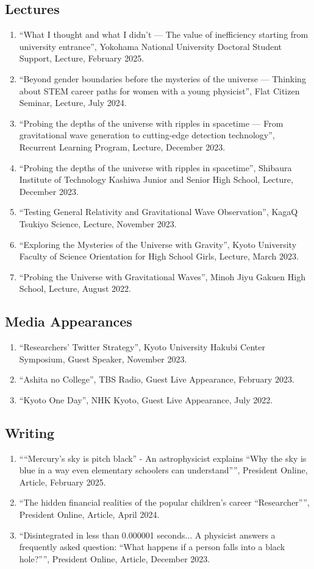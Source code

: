 \documentclass[uplatex, 12pt]{article}
\begin{document}
\subsection*{Lectures}
\begin{enumerate}
\item “What I thought and what I didn’t — The value of inefficiency starting from university entrance”, Yokohama National University Doctoral Student Support, Lecture, February 2025.
\item “Beyond gender boundaries before the mysteries of the universe — Thinking about STEM career paths for women with a young physicist”, Flat Citizen Seminar, Lecture, July 2024.
\item “Probing the depths of the universe with ripples in spacetime — From gravitational wave generation to cutting-edge detection technology”, Recurrent Learning Program, Lecture, December 2023.
\item “Probing the depths of the universe with ripples in spacetime”, Shibaura Institute of Technology Kashiwa Junior and Senior High School, Lecture, December 2023.
\item “Testing General Relativity and Gravitational Wave Observation”, KagaQ Tsukiyo Science, Lecture, November 2023.
\item “Exploring the Mysteries of the Universe with Gravity”, Kyoto University Faculty of Science Orientation for High School Girls, Lecture, March 2023.
\item “Probing the Universe with Gravitational Waves”, Minoh Jiyu Gakuen High School, Lecture, August 2022.
\end{enumerate}
\subsection*{Media Appearances}
\begin{enumerate}
\item “Researchers’ Twitter Strategy”, Kyoto University Hakubi Center Symposium, Guest Speaker, November 2023.
\item “Ashita no College”, TBS Radio, Guest Live Appearance, February 2023.
\item “Kyoto One Day”, NHK Kyoto, Guest Live Appearance, July 2022.
\end{enumerate}
\subsection*{Writing}
\begin{enumerate}
\item ““Mercury’s sky is pitch black” - An astrophysicist explains “Why the sky is blue in a way even elementary schoolers can understand””, President Online, Article, February 2025.
\item “The hidden financial realities of the popular children's career “Researcher””, President Online, Article, April 2024.
\item “Disintegrated in less than 0.000001 seconds... A physicist answers a frequently asked question: “What happens if a person falls into a black hole?””, President Online, Article, December 2023.
\end{enumerate}
\end{document}
